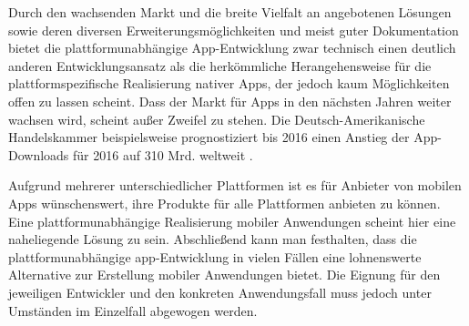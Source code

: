 
Durch den wachsenden Markt und die breite Vielfalt an angebotenen Lösungen sowie deren diversen Erweiterungsmöglichkeiten und meist guter Dokumentation bietet die plattformunabhängige App-Entwicklung zwar technisch einen deutlich anderen Entwicklungsansatz als die herkömmliche Herangehensweise für die plattformspezifische Realisierung nativer Apps, der jedoch kaum Möglichkeiten offen zu lassen scheint.
Dass der Markt für Apps in den nächsten Jahren weiter wachsen wird, scheint außer Zweifel zu stehen. Die Deutsch-Amerikanische Handelskammer beispielsweise prognostiziert bis 2016 einen Anstieg der App-Downloads für 2016 auf 310 Mrd. weltweit \cite{Mobile_Apps_Download-Zahlen}.

Aufgrund mehrerer unterschiedlicher Plattformen ist es für Anbieter von mobilen Apps wünschenswert, ihre Produkte für alle Plattformen anbieten zu können. Eine plattformunabhängige Realisierung mobiler Anwendungen scheint hier eine naheliegende Lösung zu sein. 
Abschließend kann man festhalten, dass die plattformunabhängige \gls{app}-Entwicklung in vielen Fällen eine lohnenswerte Alternative zur Erstellung mobiler Anwendungen bietet.
Die Eignung für den jeweiligen Entwickler und den konkreten Anwendungsfall muss jedoch unter Umständen im Einzelfall abgewogen werden.



